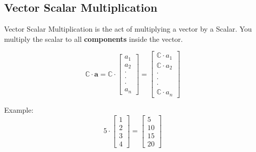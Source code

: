 \documentclass[12pt]{article}
\begin{document}
        \newpage
        \subsection{Vector Scalar Multiplication}
            Vector Scalar Multiplication is the act of multiplying a vector by a Scalar. You multiply the scalar to all \textbf{components} inside the vector.

            \begin{equation}
                \mathbb{C} \cdot \mathbf{a} = \mathbb{C} \cdot
                    \begin{bmatrix} a_1 \\ a_2 \\ \cdot \\ \cdot \\ \cdot \\ a_n \end{bmatrix} =
                    \begin{bmatrix}  \mathbb{C} \cdot a_1 \\  \mathbb{C} \cdot a_2 \\ \cdot \\ \cdot \\ \cdot \\  \mathbb{C} \cdot a_n \end{bmatrix}
            \end{equation}

            Example:
            \begin{equation}
                5 \cdot \begin{bmatrix} 1 \\ 2 \\ 3 \\ 4 \end{bmatrix} =
                \begin{bmatrix} 5 \\ 10 \\ 15 \\ 20 \end{bmatrix}
            \end{equation}

        \subsection{}
\end{document}

